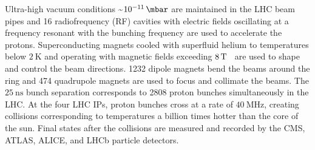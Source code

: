 Ultra-high vacuum conditions \sim$\SI{e-11}{\mbar}$ are maintained in the LHC beam pipes and 16 radiofrequency (RF) cavities with electric fields oscillating at a frequency resonant with the bunching frequency are used to accelerate the protons.
Superconducting magnets cooled with superfluid helium to temperatures below $\SI{2}{\K}$ and operating with magnetic fields exceeding $\SI{8}{\T}$~\cite{LyndonEvans_2008} are used to shape and control the beam directions.
1232 dipole magnets bend the beams around the ring and 474 quadrupole magnets are used to focus and collimate the beams.
The $\SI{25}{\ns}$ bunch separation corresponds to 2808 proton bunches simultaneously in the LHC.
At the four LHC IPs, proton bunches cross at a rate of $\SI{40}{\MHz}$, creating collisions corresponding to temperatures a billion times hotter than the core of the sun.
Final states after the collisions are measured and recorded by the CMS, ATLAS, ALICE, and LHCb particle detectors.


